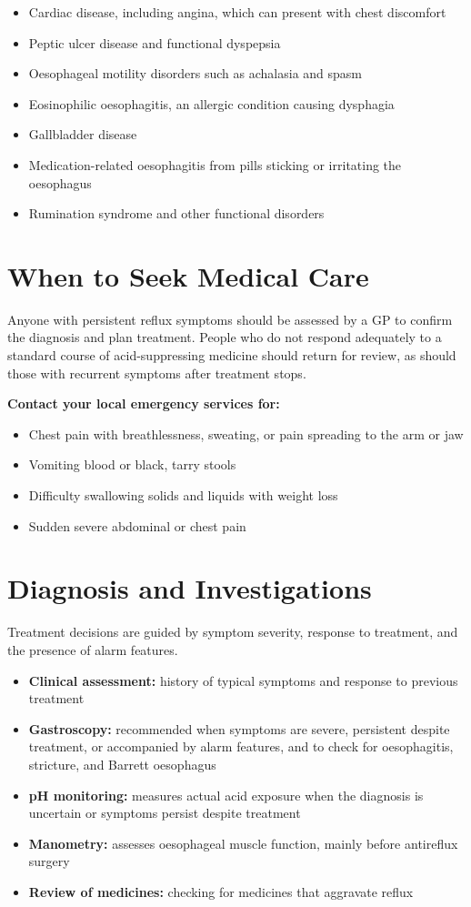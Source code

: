 \begin{itemize}
    \item Cardiac disease, including angina, which can present with chest discomfort
    \item Peptic ulcer disease and functional dyspepsia
    \item Oesophageal motility disorders such as achalasia and spasm
    \item Eosinophilic oesophagitis, an allergic condition causing dysphagia
    \item Gallbladder disease
    \item Medication-related oesophagitis from pills sticking or irritating the oesophagus
    \item Rumination syndrome and other functional disorders
\end{itemize}

\section*{When to Seek Medical Care}
Anyone with persistent reflux symptoms should be assessed by a GP to confirm the diagnosis and plan treatment. People who do not respond adequately to a standard course of acid-suppressing medicine should return for review, as should those with recurrent symptoms after treatment stops.

\textbf{Contact your local emergency services for:}
\begin{itemize}
    \item Chest pain with breathlessness, sweating, or pain spreading to the arm or jaw
    \item Vomiting blood or black, tarry stools
    \item Difficulty swallowing solids and liquids with weight loss
    \item Sudden severe abdominal or chest pain
\end{itemize}

\section*{Diagnosis and Investigations}
Treatment decisions are guided by symptom severity, response to treatment, and the presence of alarm features.

\begin{itemize}
    \item \textbf{Clinical assessment:} history of typical symptoms and response to previous treatment
    \item \textbf{Gastroscopy:} recommended when symptoms are severe, persistent despite treatment, or accompanied by alarm features, and to check for oesophagitis, stricture, and Barrett oesophagus
    \item \textbf{pH monitoring:} measures actual acid exposure when the diagnosis is uncertain or symptoms persist despite treatment
    \item \textbf{Manometry:} assesses oesophageal muscle function, mainly before antireflux surgery
    \item \textbf{Review of medicines:} checking for medicines that aggravate reflux
\end{itemize}

